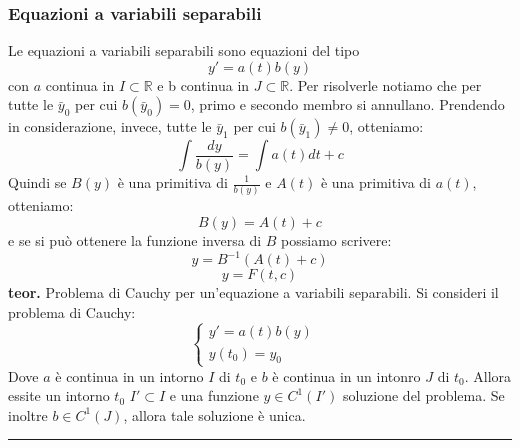 \subsubsection*{Equazioni a variabili separabili}
Le equazioni a variabili separabili sono equazioni del tipo
\[
    y' =a(t) b(y)
\]
con $a$ continua in $I \subset \mathbb{R}$ e b continua in $J \subset \mathbb{R}$.\newline
Per risolverle notiamo che per tutte le $\bar{y}_0$ per cui $b(\bar{y}_0) = 0$, primo e secondo membro si annullano.\newline
Prendendo in considerazione, invece, tutte le $\bar{y}_1$ per cui $b(\bar{y}_1) \neq 0$, otteniamo:
\[
    \int \frac{dy}{b(y)} = \int a(t) dt +c 
\]
Quindi se $B(y)$ è una primitiva di $\frac{1}{b(y)}$ e $A(t)$ è una primitiva di $a(t)$, otteniamo:
\[
    B(y) = A(t) + c
\]
e se si può ottenere la funzione inversa di $B$ possiamo scrivere:
\[
    y = B^{-1}(A(t) + c)
\]
\[
    y = F(t,c)
\]
\textbf{teor.} Problema di Cauchy per un'equazione a variabili separabili.\newline
Si consideri il problema di Cauchy:
\[
    \begin{cases}
        y' = a(t) b(y)&\\
        y(t_0) = y_0&
    \end{cases}
\]
Dove $a$ è continua in un intorno $I$ di $t_0$ e $b$ è continua in un intonro $J$ di $t_0$. Allora essite un intorno $t_0$ $I' \subset I$ e una funzione $y \in C^1(I')$ soluzione del problema.\newline
Se inoltre $b \in C^1(J)$, allora tale soluzione è unica.\newline
\rule{\textwidth}{0,4pt}
